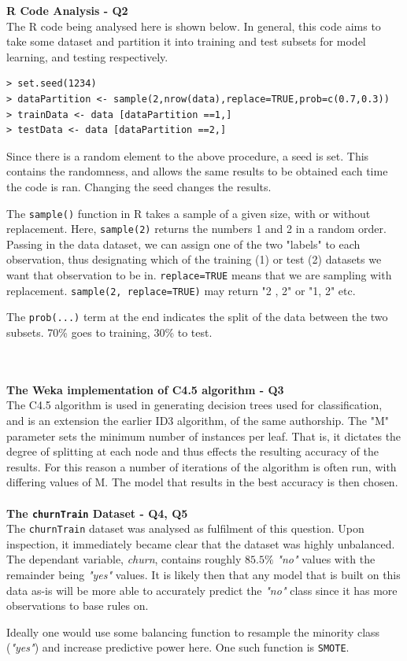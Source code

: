 \documentclass[paper=a4, fontsize=11pt]{scrartcl} %
\begin{document}
{\noindent \bf \Large R Code Analysis - Q2}\\
{The R code being analysed here is shown below. In general, this code aims to take some dataset and partition it into training and test subsets for model learning, and testing respectively. }
\begin{lstlisting}
> set.seed(1234)
> dataPartition <- sample(2,nrow(data),replace=TRUE,prob=c(0.7,0.3)) 
> trainData <- data [dataPartition ==1,]
> testData <- data [dataPartition ==2,]
\end{lstlisting}
{\par{ Since there is a random element to the above procedure, a seed is set. This contains the randomness, and allows the same results to be obtained each time the code is ran. Changing the seed changes the results.}
\par{The \texttt{sample()} function in R takes a sample of a given size, with or without replacement. Here, \texttt{sample(2)} returns the numbers 1 and 2 in a random order. Passing in the data dataset, we can assign one of the two "labels" to each observation, thus designating which of the training (1) or test (2) datasets we want that observation to be in. \texttt{replace=TRUE} means that we are sampling with replacement. \texttt{sample(2, replace=TRUE)} may return "2 , 2" or "1, 2" etc. 
\par{
The \texttt{prob(...)} term at the end indicates the split of the data between the two subsets. 70\% goes to training, 30\% to test.}}
}\\\\
{\noindent \bf \Large The Weka implementation of C4.5 algorithm - Q3}\\
{The C4.5 algorithm is used in generating decision trees used for classification, and is an extension the earlier ID3 algorithm, of the same authorship. The "M" parameter sets the minimum number of instances per leaf. That is, it dictates the degree of splitting at each node and thus effects the resulting accuracy of the results. For this reason a number of iterations of the algorithm is often run, with differing values of M. The model that results in the best accuracy is then chosen.}\\\\
{\noindent \bf \Large The \texttt{churnTrain} Dataset - Q4, Q5}\\
{The \texttt{churnTrain} dataset was analysed as fulfilment of this question. Upon inspection, it immediately became clear that the dataset was highly unbalanced. The dependant variable, {\it churn}, contains roughly $85.5\%$ {\it "no"} values with the remainder being {\it "yes"} values. It is likely then that any model that is built on this data as-is will be more able to accurately predict the {\it "no"} class since it has more observations to base rules on.} \par{Ideally one would use some balancing function to resample the minority class ({\it "yes"}) and increase predictive power here. One such function is \texttt{SMOTE}.}
\end{document}
